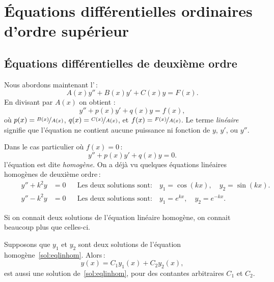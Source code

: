 \chapter[EDO d'ordre supérieur]{Équations différentielles ordinaires d'ordre supérieur} \label{ho:chapter}


\section{Équations différentielles de deuxième ordre}
\label{solinear:section}


Nous abordons maintenant l'\emph{}\,:
\begin{equation*}
A(x) y'' + B(x)y' + C(x)y = F(x) .
\end{equation*}
En divisant par $A(x)$ on obtient : 
\begin{equation} \label{sol:eqlin}
y'' + p(x)y' + q(x)y = f(x) ,
\end{equation}
où $p(x) = \nicefrac{B(x)}{A(x)}$, $q(x) = \nicefrac{C(x)}{A(x)}$, et
$f(x) = \nicefrac{F(x)}{A(x)}$.
Le terme \emph{linéaire} signifie que l'équation ne contient aucune puissance ni fonction de $y$, $y'$, ou $y''$.

Dans le cas particulier où $f(x) = 0$\,:
%
\begin{equation} \label{sol:eqlinhom}
y'' + p(x)y' + q(x)y = 0 .
\end{equation}
l'équation est dite 
\emph{homogène}.  On a déjà vu quelques équations linéaires homogènes de deuxième ordre\,:
\begin{align*}
\qquad y'' + k^2 y & = 0 &
& \text{Les deux solutions sont:} \quad y_1 = \cos (kx), \quad y_2 = \sin(kx) . \qquad \\
\qquad y'' - k^2 y & = 0 &
& \text{Les deux solutions sont:} \quad y_1 = e^{kx}, \quad y_2 = e^{-kx} . \qquad
\end{align*}

Si on connait deux solutions de l'équation linéaire homogène, on connait beaucoup plus que celles-ci.

\begin{theorem}[Superposition]
Supposons que $y_1$ et $y_2$ sont deux solutions de l'équation homogène~\eqref{sol:eqlinhom}.  Alors\,:
\begin{equation*}
y(x) = C_1 y_1(x) + C_2 y_2(x) ,
\end{equation*}
est aussi une solution de~\eqref{sol:eqlinhom}, pour des contantes arbitraires $C_1$ et $C_2$.
\end{theorem}

